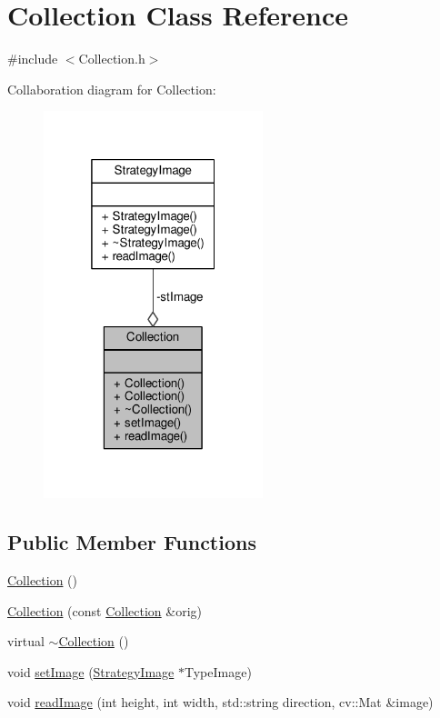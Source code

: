 \hypertarget{classCollection}{}\section{Collection Class Reference}
\label{classCollection}


{\ttfamily \#include $<$Collection.\+h$>$}



Collaboration diagram for Collection\+:
\nopagebreak
\begin{figure}[H]
\begin{center}
\leavevmode
\includegraphics[width=181pt]{classCollection__coll__graph}
\end{center}
\end{figure}
\subsection*{Public Member Functions}
\begin{DoxyCompactItemize}
\item 
\hyperlink{classCollection_a1fda66d6a2ff4fcecc74fba63abbf52f}{Collection} ()
\item 
\hyperlink{classCollection_ab42c1cfe26f486bd060cbbe215c374f0}{Collection} (const \hyperlink{classCollection}{Collection} \&orig)
\item 
virtual \hyperlink{classCollection_a017dd492156e6b570a21f58a07dd73f5}{$\sim$\+Collection} ()
\item 
void \hyperlink{classCollection_a57290652c3cf6fc744c5614e0bf49d15}{set\+Image} (\hyperlink{classStrategyImage}{Strategy\+Image} $\ast$Type\+Image)
\item 
void \hyperlink{classCollection_a251f7033e22c16a7b12dde94d9a7021e}{read\+Image} (int height, int width, std\+::string direction, cv\+::\+Mat \&image)
\end{DoxyCompactItemize}
